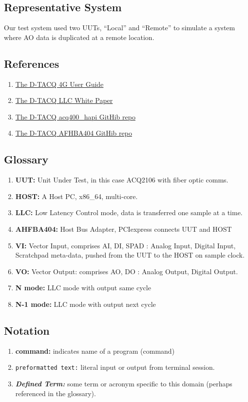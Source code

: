 \documentclass{article}
\begin{document}
\subsection{Representative System}
Our test system used two UUTs, “Local” and “Remote” to simulate a system where AO data is duplicated at a remote location.
\subsection{References}
\begin{enumerate}
	\item \href{http://www.d-tacq.com/resources/d-tacq-4G-acq4xx-UserGuide-r28.pdf}{The D-TACQ 4G User Guide}
	\item \href{http://www.d-tacq.com/resources/LLC_White_Paper.pdf}{The D-TACQ LLC White Paper}
	\item \href{https://github.com/D-TACQ/acq400_hapi}{The D-TACQ acq400\_hapi GitHib repo}
	\item \href{https://github.com/D-TACQ/AFHBA404}{The D-TACQ AFHBA404 GitHib repo}
\end{enumerate}

\subsection{Glossary}
\begin{enumerate}
	\item \textbf{UUT:} Unit Under Test, in this case ACQ2106 with fiber optic comms.
	\item \textbf{HOST:} A Host PC, x86\_64, multi-core.
	\item \textbf{LLC:} Low Latency Control mode, data is transferred one sample at a time.
	\item \textbf{AHFBA404:} Host Bus Adapter, PCIexpress connects UUT and HOST
	\item \textbf{VI:} Vector Input, comprises AI, DI, SPAD : Analog Input, Digital Input, Scratchpad meta-data, pushed from the UUT to the HOST on sample clock.
	\item \textbf{VO:} Vector Output: comprises AO, DO : Analog Output, Digital Output.
	\item \textbf{N mode:} LLC mode with output same cycle
	\item \textbf{N-1 mode:} LLC mode with output next cycle
\end{enumerate}

\subsection{Notation}
\begin{enumerate}
	\item \textbf{command:} indicates name of a program (command)
	\item \verb|preformatted text:| literal input or output from terminal session.
	\item \emph{\textbf{Defined Term:}} some term or acronym specific to this domain (perhaps referenced in the glossary).
\end{enumerate}
\end{document}
